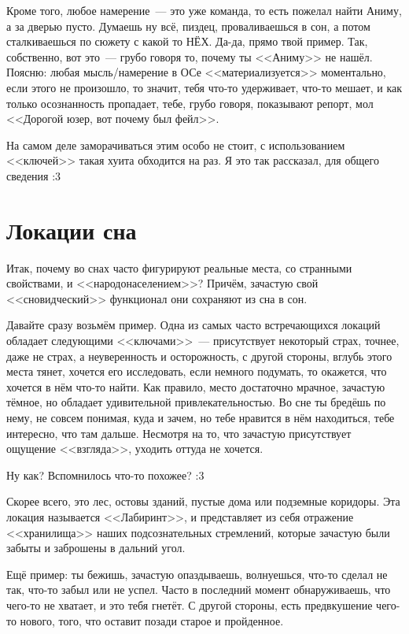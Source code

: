 \documentclass[a4paper,14pt,oneside]{memoir}
\begin{document}
Кроме того, любое намерение~--- это уже команда, то есть пожелал найти Аниму, а за дверью пусто. Думаешь ну всё, пиздец, проваливаешься в сон, а потом сталкиваешься по сюжету с какой то НЁХ. Да-да, прямо твой пример. Так, собственно, вот это~--- грубо говоря то, почему ты <<Аниму>> не нашёл. Поясню: любая мысль/намерение в ОСе <<материализуется>> моментально, если этого не произошло, то значит, тебя что-то удерживает, что-то мешает, и как только осознанность пропадает, тебе, грубо говоря, показывают репорт, мол <<Дорогой юзер, вот почему был фейл>>. 

На самом деле заморачиваться этим особо не стоит, с использованием <<ключей>> такая хуита обходится на раз. Я это так рассказал, для общего сведения :3




\chapter{Локации сна}

Итак, почему во снах часто фигурируют реальные места, со странными свойствами, и <<народонаселением>>? Причём, зачастую свой <<сновидческий>> функционал они сохраняют из сна в сон.

Давайте сразу возьмём пример. Одна из самых часто встречающихся локаций обладает следующими <<ключами>>~--- присутствует некоторый страх, точнее, даже не страх, а неуверенность и осторожность, с другой стороны, вглубь этого места тянет, хочется его исследовать, если немного подумать, то окажется, что хочется в нём что-то найти. Как правило, место достаточно мрачное, зачастую тёмное, но обладает удивительной привлекательностью. Во сне ты бредёшь по нему, не совсем понимая, куда и зачем, но тебе нравится в нём находиться, тебе интересно, что там дальше. Несмотря на то, что зачастую присутствует ощущение <<взгляда>>, уходить оттуда не хочется. 

Ну как? Вспомнилось что-то похожее? :3 

Скорее всего, это лес, остовы зданий, пустые дома или подземные коридоры. Эта локация называется <<Лабиринт>>, и представляет из себя отражение <<хранилища>> наших подсознательных стремлений, которые зачастую были забыты и заброшены в дальний угол. 

Ещё пример: ты бежишь, зачастую опаздываешь, волнуешься, что-то сделал не так, что-то забыл или не успел. Часто в последний момент обнаруживаешь, что чего-то не хватает, и это тебя гнетёт. С другой стороны, есть предвкушение чего-то нового, того, что оставит позади старое и пройденное.
\end{document}
